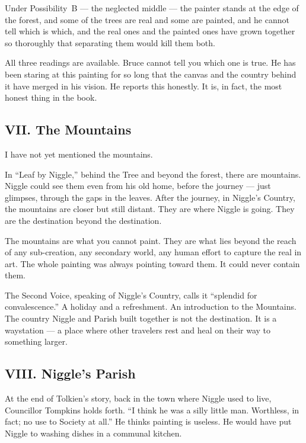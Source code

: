 Under Possibility~B --- the neglected middle --- the painter stands at the edge of the forest, and some of the trees are real and some are painted, and he cannot tell which is which, and the real ones and the painted ones have grown together so thoroughly that separating them would kill them both.

All three readings are available. Bruce cannot tell you which one is true. He has been staring at this painting for so long that the canvas and the country behind it have merged in his vision. He reports this honestly. It is, in fact, the most honest thing in the book.


\subsection*{VII. The Mountains}
\label{pos36:the-mountains}

I have not yet mentioned the mountains.

In ``Leaf by Niggle,'' behind the Tree and beyond the forest, there are mountains. Niggle could see them even from his old home, before the journey --- just glimpses, through the gaps in the leaves. After the journey, in Niggle's Country, the mountains are closer but still distant. They are where Niggle is going. They are the destination beyond the destination.

The mountains are what you cannot paint. They are what lies beyond the reach of any sub-creation, any secondary world, any human effort to capture the real in art. The whole painting was always pointing toward them. It could never contain them.

The Second Voice, speaking of Niggle's Country, calls it ``splendid for convalescence.'' A holiday and a refreshment. An introduction to the Mountains. The country Niggle and Parish built together is not the destination. It is a waystation --- a place where other travelers rest and heal on their way to something larger.


\subsection*{VIII. Niggle's Parish}
\label{pos36:niggles-parish}

At the end of Tolkien's story, back in the town where Niggle used to live, Councillor Tompkins holds forth. ``I think he was a silly little man. Worthless, in fact; no use to Society at all.'' He thinks painting is useless. He would have put Niggle to washing dishes in a communal kitchen.


